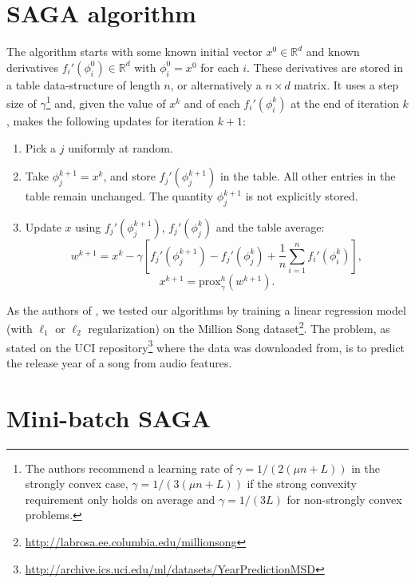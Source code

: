 \documentclass[a4paper,11pt]{article}
\newcommand{\R}{\mathbb{R}}
\newcommand{\prox}{\textrm{prox}}
\begin{document}
\section{SAGA algorithm} \label{sec1}

The algorithm starts with some known initial vector $x^0 \in \R^d$ and known
derivatives $f_i' (\phi_i^0) \in \R^d$ with $\phi_i^0 = x^0$ for each $i$. These
derivatives are stored in a table data-structure of length $n$, or alternatively
a $n \times d$ matrix. It uses a step size of $\gamma$\footnote{The authors
recommend a learning rate of $\gamma=1/(2(\mu n+L))$ in the strongly convex
case, $\gamma=1/(3(\mu n+L))$ if the strong convexity requirement only holds on
average and $\gamma=1/(3L)$ for non-strongly convex problems.} and, given the
value of $x^k$ and of each $f_i' (\phi_i^k)$ at the end of iteration $k$, makes
the following updates for iteration $k+1$:
\begin{enumerate}
\item Pick a $j$ uniformly at random.
\item Take $\phi_j^{k+1} = x^k$, and store $f_j'(\phi_j^{k+1})$ in the table.
	All other entries in the table remain unchanged. The quantity $\phi_j^{k+1}$
	is not explicitly stored.
\item Update $x$ using $f_j'(\phi_j^{k+1})$, $f_j'(\phi_j^k)$ and the table
	average:
	\begin{equation} \label{eqn:saga}
	w^{k+1} = x^k - \gamma \left[ f_j'(\phi_j^{k+1}) - f_j'(\phi_j^k)
	+ \frac1n \sum_{i=1}^n f_i'(\phi_i^k) \right] ,
	\end{equation}
	$$x^{k+1} = \prox_\gamma^h (w^{k+1}).$$
\end{enumerate}

As the authors of \cite{defazio_saga_2014}, we tested our algorithms by training
a linear regression model (with $\ell_1$ or $\ell_2$ regularization) on the
Million Song dataset\footnote{
\url{http://labrosa.ee.columbia.edu/millionsong}}. The problem, as stated on the
UCI repository\footnote{
\url{http://archive.ics.uci.edu/ml/datasets/YearPredictionMSD}} where the data
was downloaded from, is to predict the release year of a song from audio
features.

\section{Mini-batch SAGA}
\end{document}
